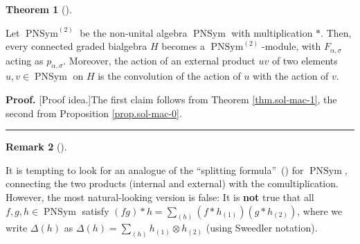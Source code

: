 \documentclass[numbers=enddot,12pt,final,onecolumn,notitlepage]{scrartcl}%
\theoremstyle{definition}
\newtheorem{theo}{Theorem}[section]
\newenvironment{theorem}[1][]
{\begin{theo}[#1]\begin{leftbar}}
{\end{leftbar}\end{theo}}
\newtheorem{remk}[theo]{Remark}
\newenvironment{remark}[1][]
{\begin{remk}[#1]\begin{leftbar}}
{\end{leftbar}\end{remk}}
\newenvironment{proof}[1][Proof]{\noindent\textbf{#1.} }{\ \rule{0.5em}{0.5em}}
\let\sumnonlimits\sum
\renewcommand{\sum}{\sumnonlimits\limits}
\begin{document}
\begin{theorem}
\label{thm.PNSym.mods}Let $\operatorname*{PNSym}\nolimits^{\left(  2\right)
}$ be the non-unital algebra $\operatorname*{PNSym}$ with multiplication
$\ast$. Then, every connected graded bialgebra $H$ becomes a
$\operatorname*{PNSym}\nolimits^{\left(  2\right)  }$-module, with
$F_{\alpha,\sigma}$ acting as $p_{\alpha,\sigma}$. Moreover, the action of an
external product $uv$ of two elements $u,v\in\operatorname*{PNSym}$ on $H$ is
the convolution of the action of $u$ with the action of $v$.
\end{theorem}


\begin{proof}
[Proof idea.]The first claim follows from Theorem \ref{thm.sol-mac-1}, the
second from Proposition \ref{prop.sol-mac-0}.
\end{proof}

\begin{remark}
\label{rmk.splitting}It is tempting to look for an analogue of the
\textquotedblleft splitting formula\textquotedblright\ (\cite[Proposition
5.2]{ncsf1}) for $\operatorname*{PNSym}$, connecting the two products
(internal and external) with the comultiplication. However, the most
natural-looking version is false: It is \textbf{not} true that all
$f,g,h\in\operatorname*{PNSym}$ satisfy $\left(  fg\right)  \ast
h=\sum_{\left(  h\right)  }\left(  f\ast h_{\left(  1\right)  }\right)
\left(  g\ast h_{\left(  2\right)  }\right)  $, where we write $\Delta\left(
h\right)  $ as $\Delta\left(  h\right)  =\sum_{\left(  h\right)  }h_{\left(
1\right)  }\otimes h_{\left(  2\right)  }$ (using Sweedler notation).
\end{remark}



\end{document}
